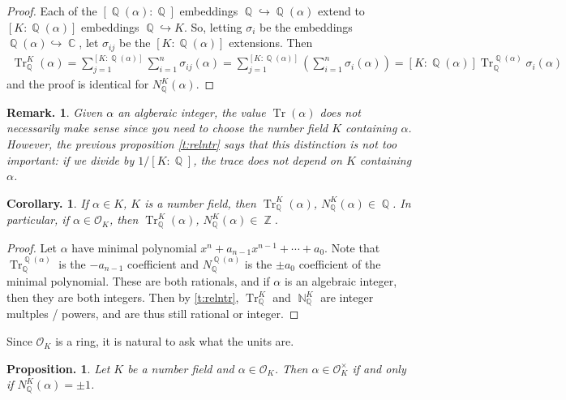 \documentclass[11pt, a4paper]{memoir}
\DeclareMathOperator{\N}{{\mathbb{N}}}
\DeclareMathOperator{\Q}{{\mathbb{Q}}}
\DeclareMathOperator{\Z}{{\mathbb{Z}}}
\DeclareMathOperator{\C}{{\mathbb{C}}}
\newcommand{\hto}[0]{\ensuremath{\hookrightarrow}}
\theoremstyle{change}
\newtheorem{corollary}[theorem]{Corollary.}
\newtheorem{proposition}[theorem]{Proposition.}
\theoremstyle{plain}
\theoremstyle{nonumberplain}
\newtheorem{remark}{Remark.}
\newtheorem{proof}{Proof}
\DeclareMathOperator{\Tr}{Tr}
\numberwithin{equation}{section}
\begin{document}
\begin{proof}
    Each of the $[\Q(\alpha):\Q]$ embeddings $\Q\hto\Q(\alpha)$ extend to $[K:\Q(\alpha)]$ embeddings $\Q\hto K$.
    So, letting $\sigma_i$ be the embeddings $\Q(\alpha)\hto\C$, let $\sigma_{ij}$ be the $[K:\Q(\alpha)]$ extensions.
    Then
    \begin{align*}
        \Tr_{\Q}^K(\alpha) = \sum_{j=1}^{[K:\Q(\alpha)]}\sum_{i=1}^n\sigma_{ij}(\alpha)= \sum_{j=1}^{[K:\Q(\alpha)]}\left(\sum_{i=1}^n\sigma_{i}(\alpha)\right)=[K:\Q(\alpha)]\Tr_{\Q}^{\Q(\alpha)}\sigma_i(\alpha)
    \end{align*}
    and the proof is identical for $N_{\Q}^K(\alpha)$.
\end{proof}
\begin{remark}
    Given $\alpha$ an algberaic integer, the value $\Tr(\alpha)$ does not necessarily make sense since you need to choose the number field $K$ containing $\alpha$.
    However, the previous proposition \cref{t:relntr} says that this distinction is not too important: if we divide by $1/[K:\Q]$, the trace does not depend on $K$ containing $\alpha$.
\end{remark}
\begin{corollary}
    If $\alpha\in K$, $K$ is a number field, then $\Tr_{\Q}^K(\alpha)$, $N_{\Q}^K(\alpha)\in\Q$.
    In particular, if $\alpha\in\mathcal{O}_K$, then $\Tr_{\Q}^K(\alpha)$, $N_{\Q}^K(\alpha)\in\Z$.
\end{corollary}
\begin{proof}
    Let $\alpha$ have minimal polynomial $x^n+a_{n-1}x^{n-1}+\cdots+a_0$.
    Note that $\Tr_{\Q}^{\Q(\alpha)}$ is the $-a_{n-1}$ coefficient and $N_{\Q}^{\Q(\alpha)}$ is the $\pm a_0$ coefficient of the minimal polynomial.
    These are both rationals, and if $\alpha$ is an algebraic integer, then they are both integers.
    Then by \cref{t:relntr}, $\Tr_{\Q}^K$ and $\N_{\Q}^K$ are integer multples / powers, and are thus still rational or integer.
\end{proof}
Since $\mathcal{O}_K$ is a ring, it is natural to ask what the units are.
\begin{proposition}\label{p:unit}
    Let $K$ be a number field and $\alpha\in\mathcal{O}_K$.
    Then $\alpha\in\mathcal{O}_K^\times$ if and only if $N_{\Q}^K(\alpha)=\pm 1$.
\end{proposition}
\end{document}
